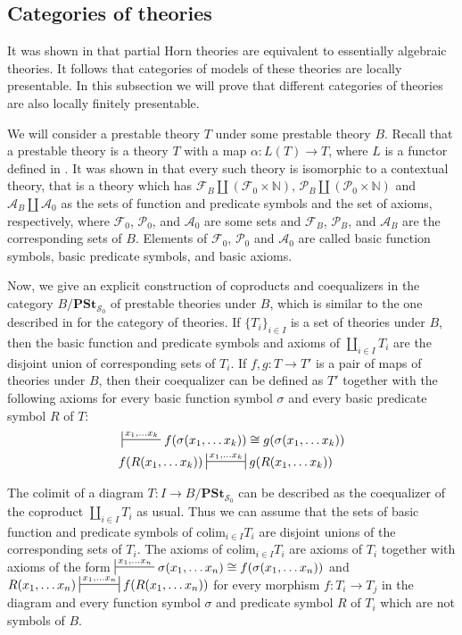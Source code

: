 \documentclass[reqno]{amsart}
\theoremstyle{definition}
\theoremstyle{remark}
\newcommand{\cat}[1]{\mathbf{#1}}
\newcommand{\colim}{\mathrm{colim}}
\newcommand{\PSt}{\cat{PSt}}
\numberwithin{figure}{section}
\begin{document}
\subsection{Categories of theories}

It was shown in \cite{PHL} that partial Horn theories are equivalent to essentially algebraic theories.
It follows that categories of models of these theories are locally presentable.
In this subsection we will prove that different categories of theories are also locally finitely presentable.

We will consider a prestable theory $T$ under some prestable theory $B$.
Recall that a prestable theory is a theory $T$ with a map $\alpha : L(T) \to T$, where $L$ is a functor defined in \cite{alg-tt}.
It was shown in \cite[Lemma~4.4]{alg-tt} that every such theory is isomorphic to a contextual theory,
that is a theory which has $\mathcal{F}_B \amalg (\mathcal{F}_0 \times \mathbb{N})$,
$\mathcal{P}_B \amalg (\mathcal{P}_0 \times \mathbb{N})$ and $\mathcal{A}_B \amalg \mathcal{A}_0$ as the sets of function and predicate symbols and the set of axioms, respectively,
where $\mathcal{F}_0$, $\mathcal{P}_0$, and $\mathcal{A}_0$ are some sets and $\mathcal{F}_B$, $\mathcal{P}_B$, and $\mathcal{A}_B$ are the corresponding sets of $B$.
Elements of $\mathcal{F}_0$, $\mathcal{P}_0$ and $\mathcal{A}_0$ are called basic function symbols, basic predicate symbols, and basic axioms.

Now, we give an explicit construction of coproducts and coequalizers in the category $B/\PSt_{\mathcal{S}_0}$ of prestable theories under $B$,
which is similar to the one described in \cite[Proposition~2.12]{alg-tt} for the category of theories.
If $\{ T_i \}_{i \in I}$ is a set of theories under $B$, then the basic function and predicate symbols
and axioms of $\coprod_{i \in I} T_i$ are the disjoint union of corresponding sets of $T_i$.
If $f,g : T \to T'$ is a pair of maps of theories under $B$, then their coequalizer can be defined as
$T'$ together with the following axioms for every basic function symbol $\sigma$ and every basic predicate symbol $R$ of $T$:
\begin{align*}
& \sststile{}{x_1, \ldots x_k} f(\sigma(x_1, \ldots x_k)) \cong g(\sigma(x_1, \ldots x_k)) \\
& f(R(x_1, \ldots x_k)) \ssststile{}{x_1, \ldots x_k} g(R(x_1, \ldots x_k))
\end{align*}

The colimit of a diagram $T : I \to B/\PSt_{\mathcal{S}_0}$ can be described as the coequalizer of the coproduct $\coprod_{i \in I} T_i$ as usual.
Thus we can assume that the sets of basic function and predicate symbols of $\colim_{i \in I} T_i$ are disjoint unions of the corresponding sets of $T_i$.
The axioms of $\colim_{i \in I} T_i$ are axioms of $T_i$ together with axioms of the form $\sststile{}{x_1, \ldots x_n} \sigma(x_1, \ldots x_n) \cong f(\sigma(x_1, \ldots x_n))$
and $R(x_1, \ldots x_n) \ssststile{}{x_1, \ldots x_n} f(R(x_1, \ldots x_n))$ for every morphism $f : T_i \to T_j$
in the diagram and every function symbol $\sigma$ and predicate symbol $R$ of $T_i$ which are not symbols of $B$.
\end{document}
